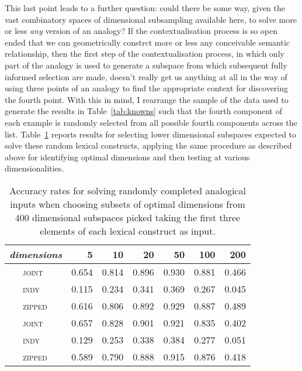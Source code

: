 This last point leads to a further question: could there be some way, given the vast combinatory spaces of dimensional subsampling available here, to solve more or less \emph{any} version of an analogy?  If the contextualisation process is so open ended that we can geometrically constrct more or less any conceivable semantic relationship, then the first step of the contextualisation process, in which only part of the analogy is used to generate a subspace from which subsequent fully informed selection are made, doesn't really get us anything at all in the way of using three points of an analogy to find the appropriate context for discovering the fourth point.  With this in mind, I rearrange the sample of the data used to generate the results in Table~\ref{tab:knowns} such that the fourth component of each example is randomly selected from all possible fourth components across the list.  Table~\ref{tab:fakes} reports results for selecting lower dimensional subspaces expected to solve these random lexical constructs, applying the same procedure as described above for identifying optimal dimensions and then testing at various dimensionalities.

\begin{table}
\centering
\begin{tabular}{clrrrrrr}
\hline
\multicolumn{2}{l}{\emph{dimensions}} & 5 & 10 & 20 & 50 & 100 & 200 \\
\hline
\parbox[t]{2mm}{} & \textsc{joint} & 0.654 & 0.814 & 0.896 & 0.930 & 0.881 & 0.466 \\
& \textsc{indy} & 0.115 & 0.234 & 0.341 & 0.369 & 0.267 & 0.045 \\
& \textsc{zipped} & 0.616 & 0.806 & 0.892 & 0.929 & 0.887 & 0.489 \\
\hline
\parbox[t]{2mm}{} & \textsc{joint} & 0.657 & 0.828 & 0.901 & 0.921 & 0.835 & 0.402 \\
& \textsc{indy} & 0.129 & 0.253 & 0.338 & 0.384 & 0.277 & 0.051 \\
& \textsc{zipped} & 0.589 & 0.790 & 0.888 & 0.915 & 0.876 & 0.418 \\
\hline
\end{tabular}
\caption[Finding Spaces for Fake Analogies]{Accuracy rates for solving randomly completed analogical inputs when choosing subsets of optimal dimensions from 400 dimensional subspaces picked taking the first three elements of each lexical construct as input.}
\label{tab:fakes}
\end{table}

